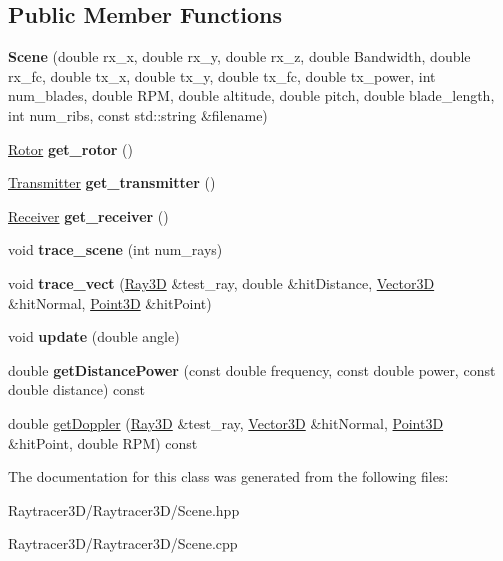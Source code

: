 \subsection*{Public Member Functions}
\begin{DoxyCompactItemize}
\item 
\hypertarget{class_scene_a39f55da2de994a41500a2c0a3bbc207d}{}\label{class_scene_a39f55da2de994a41500a2c0a3bbc207d} 
{\bfseries Scene} (double rx\+\_\+x, double rx\+\_\+y, double rx\+\_\+z, double Bandwidth, double rx\+\_\+fc, double tx\+\_\+x, double tx\+\_\+y, double tx\+\_\+fc, double tx\+\_\+power, int num\+\_\+blades, double R\+PM, double altitude, double pitch, double blade\+\_\+length, int num\+\_\+ribs, const std\+::string \&filename)
\item 
\hypertarget{class_scene_a59d78e42eebf29106e413275abacf983}{}\label{class_scene_a59d78e42eebf29106e413275abacf983} 
\hyperlink{class_rotor}{Rotor} {\bfseries get\+\_\+rotor} ()
\item 
\hypertarget{class_scene_aeca85b3d6824c3509c94991136fe6a1b}{}\label{class_scene_aeca85b3d6824c3509c94991136fe6a1b} 
\hyperlink{class_transmitter}{Transmitter} {\bfseries get\+\_\+transmitter} ()
\item 
\hypertarget{class_scene_aea609d389de6e5c483d3e7f19a3aff0a}{}\label{class_scene_aea609d389de6e5c483d3e7f19a3aff0a} 
\hyperlink{class_receiver}{Receiver} {\bfseries get\+\_\+receiver} ()
\item 
\hypertarget{class_scene_a2d3012d31a139a597d50f5b84fbec51d}{}\label{class_scene_a2d3012d31a139a597d50f5b84fbec51d} 
void {\bfseries trace\+\_\+scene} (int num\+\_\+rays)
\item 
\hypertarget{class_scene_a26979e16c27d21bdd615c24c1c11902c}{}\label{class_scene_a26979e16c27d21bdd615c24c1c11902c} 
void {\bfseries trace\+\_\+vect} (\hyperlink{class_ray3_d}{Ray3D} \&test\+\_\+ray, double \&hit\+Distance, \hyperlink{class_vector3_d}{Vector3D} \&hit\+Normal, \hyperlink{class_point3_d}{Point3D} \&hit\+Point)
\item 
\hypertarget{class_scene_a9af282cee68bb4748bd15568bda0ecfb}{}\label{class_scene_a9af282cee68bb4748bd15568bda0ecfb} 
void {\bfseries update} (double angle)
\item 
\hypertarget{class_scene_a76fa370d0c210100d4cf8799474faa8d}{}\label{class_scene_a76fa370d0c210100d4cf8799474faa8d} 
double {\bfseries get\+Distance\+Power} (const double frequency, const double power, const double distance) const
\item 
double \hyperlink{class_scene_a969abe0e6022d73ff082d380c59d83f5}{get\+Doppler} (\hyperlink{class_ray3_d}{Ray3D} \&test\+\_\+ray, \hyperlink{class_vector3_d}{Vector3D} \&hit\+Normal, \hyperlink{class_point3_d}{Point3D} \&hit\+Point, double R\+PM) const
\end{DoxyCompactItemize}

The documentation for this class was generated from the following files\+:\begin{DoxyCompactItemize}
\item 
Raytracer3\+D/\+Raytracer3\+D/Scene.\+hpp\item 
Raytracer3\+D/\+Raytracer3\+D/Scene.\+cpp\end{DoxyCompactItemize}
